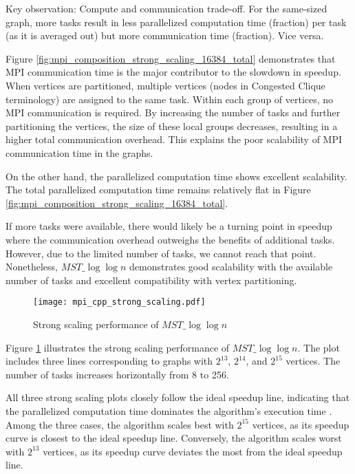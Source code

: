 \documentclass[english, 12pt, a4paper, elec, utf8, a-2b, online]{aaltothesis}
\newcommand{\mstalgo}{$MST\_\log\log{n}$}
\begin{document}
\begin{tcolorbox}[colback=white,colframe=black,boxrule=1pt,arc=0pt]
	Key observation: Compute and communication trade-off. For the same-sized graph, more tasks result in less parallelized computation time (fraction) per task (as it is averaged out) but more communication time (fraction). Vice versa.
\end{tcolorbox}

Figure \cref{fig:mpi_composition_strong_scaling_16384_total} demonstrates that MPI communication time is the major contributor to the slowdown in speedup. When vertices are partitioned, multiple vertices (nodes in Congested Clique terminology) are assigned to the same task. Within each group of vertices, no MPI communication is required. By increasing the number of tasks and further partitioning the vertices, the size of these local groups decreases, resulting in a higher total communication overhead. This explains the poor scalability of MPI communication time in the graphs.

On the other hand, the parallelized computation time shows excellent scalability. The total parallelized computation time remains relatively flat in Figure \cref{fig:mpi_composition_strong_scaling_16384_total}.

If more tasks were available, there would likely be a turning point in speedup where the communication overhead outweighs the benefits of additional tasks. However, due to the limited number of tasks, we cannot reach that point. Nonetheless, \mstalgo{} demonstrates good scalability with the available number of tasks and excellent compatibility with vertex partitioning.

\begin{figure}[h]
	\centering
		\texttt{[image: mpi\_cpp\_strong\_scaling.pdf]}
	\caption{Strong scaling performance of \mstalgo{}}
	\label{fig:mpi_cpp_strong_scaling}
\end{figure}

Figure \cref{fig:mpi_cpp_strong_scaling} illustrates the strong scaling performance of \mstalgo{}. The plot includes three lines corresponding to graphs with \(2^{13}\), \(2^{14}\), and \(2^{15}\) vertices. The number of tasks increases horizontally from 8 to 256.

All three strong scaling plots closely follow the ideal speedup line, indicating that the parallelized computation time dominates the algorithm's execution time \cite{HPCScaling}. Among the three cases, the algorithm scales best with \(2^{15}\) vertices, as its speedup curve is closest to the ideal speedup line. Conversely, the algorithm scales worst with \(2^{13}\) vertices, as its speedup curve deviates the most from the ideal speedup line.
\end{document}
